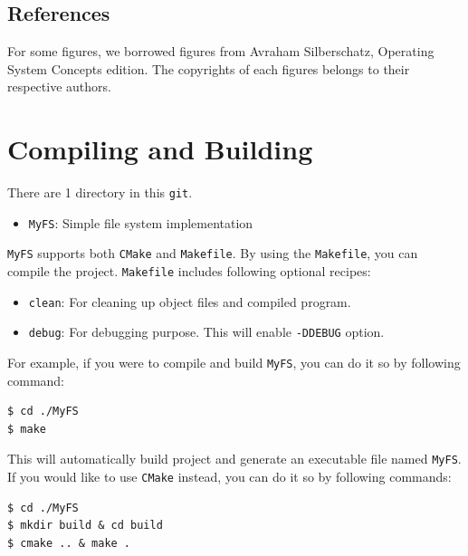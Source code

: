 \documentclass{homework}
\begin{document}
\subsection{References}
For some figures, we borrowed figures from Avraham Silberschatz, Operating System Concepts  edition. The copyrights of each figures belongs to their respective authors.

\pagebreak

\section{Compiling and Building} 
There are 1 directory in this \texttt{git}.
\begin{itemize}
   \item \texttt{MyFS}: Simple file system implementation
\end{itemize}

\texttt{MyFS} supports both \texttt{CMake} and \texttt{Makefile}. By using the \texttt{Makefile}, you can compile the project. \texttt{Makefile} includes following optional recipes:
\begin{itemize}
   \item \texttt{clean}: For cleaning up object files and compiled program.
   \item \texttt{debug}: For debugging purpose. This will enable \texttt{-DDEBUG} option. 
\end{itemize}

For example, if you were to compile and build \texttt{MyFS}, you can do it so by following command:
\\
\begin{center}
\begin{code}
\begin{verbatim}
$ cd ./MyFS
$ make 
\end{verbatim}
\end{code}
\end{center}

This will automatically build project and generate an executable file named \texttt{MyFS}. If you would like to use \texttt{CMake} instead, you can do it so by following commands:
\\
\begin{center}
\begin{code}
\begin{verbatim}
$ cd ./MyFS
$ mkdir build & cd build
$ cmake .. & make .
\end{verbatim}
\end{code}
\end{center}
\end{document}
